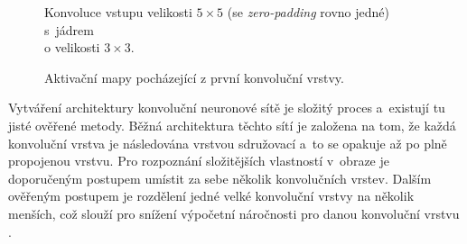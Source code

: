 \begin{figure}[!htb]
    \centering
    \begin{minipage}{.5\textwidth}
      \centering
      \caption{Konvoluce vstupu velikosti $5\times5$ (se \emph{zero-padding} rovno jedné) s~jádrem \\ o velikosti $3\times3$.}
      \label{fig:cnnKonvoluce}
    \end{minipage}%
    \begin{minipage}{.5\textwidth}
      \centering
      \caption{Aktivační mapy pocházející z první konvoluční vrstvy.\footnotemark}
      \label{fig:cnnHeatMap}
    \end{minipage}%
\end{figure}

Vytváření architektury konvoluční neuronové sítě je složitý proces a~existují tu jisté ověřené metody. Běžná architektura těchto sítí je založena na tom, že každá konvoluční vrstva je následována vrstvou sdružovací a~to se opakuje až po plně propojenou vrstvu. Pro rozpoznání složitějších vlastností v~obraze je doporučeným postupem umístit za sebe několik konvolučních vrstev. Dalším ověřeným postupem je rozdělení jedné velké konvoluční vrstvy na několik menších, což slouží pro snížení výpočetní náročnosti pro danou konvoluční vrstvu \cite{CNN}.

